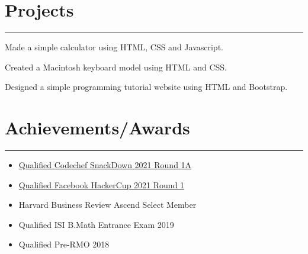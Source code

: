 \documentclass[]{debjitpal-resume}
\begin{document}
\begin{minipage}[t]{0.6\textwidth}
  \section{Projects}
  \noindent\rule{12.5cm}{0.4pt}
   
  \noindent
  \hspace{4em}%
  \begin{minipage}{0.85\textwidth\vspace{5pt}}
    Made a simple calculator using HTML, CSS and Javascript.
  \end{minipage}
   
  \noindent
  \hspace{4em}%
  \begin{minipage}{0.85\textwidth\vspace{5pt}}
    Created a Macintosh keyboard model using HTML and CSS.
  \end{minipage}
   
  \noindent
  \hspace{4em}%
  \begin{minipage}{0.85\textwidth\vspace{5pt}}
    Designed a simple programming tutorial website using HTML and Bootstrap.
  \end{minipage}
  \section{Achievements/Awards}
  \noindent\rule{12.5cm}{0.4pt}
  \begin{itemize}
    \item \href{https://drive.google.com/file/d/1-0QWUmpZN7C7IGu7rhQgXSEN-h2_1IYc/view?usp=sharing}{Qualified Codechef SnackDown 2021 Round 1A}
    \item \href{https://drive.google.com/file/d/1-0W_lI_ffQuWv2Uz8gHq8oKya2hHcKIh/view?usp=sharing}{Qualified Facebook HackerCup 2021 Round 1}
    \item Harvard Business Review Ascend Select Member
    \item Qualified ISI B.Math Entrance Exam 2019
    \item Qualified Pre-RMO 2018
  \end{itemize}

\end{minipage}
\end{document}
